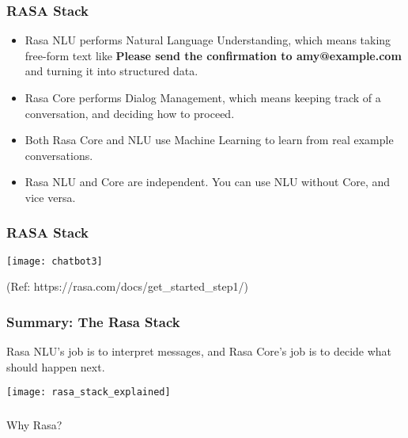  \begin{frame}[fragile]\frametitle{RASA Stack}
\begin{itemize}
\item Rasa NLU performs Natural Language Understanding, which means taking free-form text like
{\bf Please send the confirmation to amy@example.com}
and turning it into structured data. 
\item Rasa Core performs Dialog Management, which means keeping track of a conversation, and deciding how to proceed. 
\item Both Rasa Core and NLU use Machine Learning to learn from real example conversations.
\item Rasa NLU and Core are independent. You can use NLU without Core, and vice versa.
\end{itemize}
\end{frame}

 \begin{frame}[fragile]\frametitle{RASA Stack}
\begin{center}
\texttt{[image: chatbot3]}
\end{center}

{\tiny (Ref: https://rasa.com/docs/get\_started\_step1/)}

\end{frame}



 \begin{frame}[fragile]\frametitle{Summary: The Rasa Stack}
Rasa NLU's job is to interpret messages, and Rasa Core's job is to decide what should happen next.

\begin{center}
\texttt{[image: rasa\_stack\_explained]}
\end{center}

\end{frame}



\begin{frame}[fragile]\frametitle{}
\begin{center}
{\Large Why Rasa?}
\end{center}
\end{frame}

